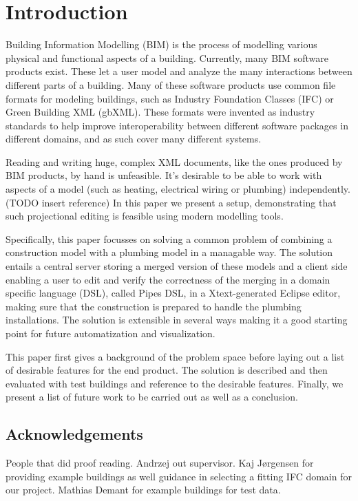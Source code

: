 


\setcounter{page}{1}
\section{Introduction}
Building Information Modelling (BIM) is the process of modelling various physical and functional aspects of a building. Currently, many BIM software products exist. These let a user model and analyze the many interactions between different parts of a building. Many of these software products use common file formats for modeling buildings, such as Industry Foundation Classes (IFC) or Green Building XML (gbXML). These formats were invented as industry standards to help improve interoperability between different software packages in different domains, and as such cover many different systems.

Reading and writing huge, complex XML documents, like the ones produced by BIM products, by hand is unfeasible. It’s desirable to be able to work with aspects of a model (such as heating, electrical wiring or plumbing) independently.(TODO insert reference) In this paper we present a setup, demonstrating that such projectional editing is feasible using modern modelling tools.

Specifically, this paper focusses on solving a common problem of combining a construction model with a plumbing model in a managable way. The solution entails a central server storing a merged version of these models and a client side enabling a user to edit and verify the correctness of the merging in a domain specific language (DSL), called Pipes DSL, in a Xtext-generated Eclipse editor, making sure that the construction is prepared to handle the plumbing installations. The solution is extensible in several ways making it a good starting point for future automatization and visualization.

This paper first gives a background of the problem space before laying out a list of desirable features for the end product. The solution is described and then evaluated with test buildings and reference to the desirable features. Finally, we present a list of future work to be carried out as well as a conclusion.
\subsection{Acknowledgements}
People that did proof reading. Andrzej out supervisor. Kaj Jørgensen for providing example buildings as well guidance in selecting a fitting IFC domain for our project. Mathias Demant for example buildings for test data.

